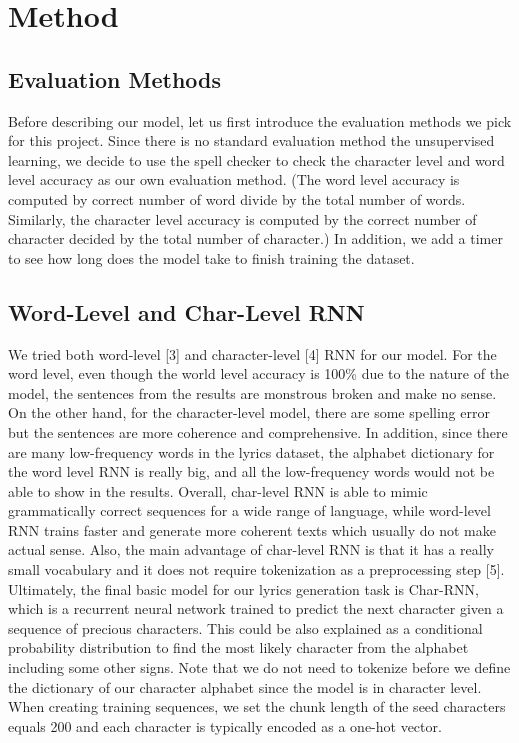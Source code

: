 \documentclass[11pt,a4paper]{article}
\begin{document}
\section{Method}
\subsection{Evaluation Methods}
Before describing our model, let us first introduce the evaluation methods we pick for this project. Since there is no standard evaluation method the unsupervised learning, we decide to use the spell checker to check the character level and word level accuracy as our own evaluation method. (The word level accuracy is computed by correct number of word divide by the total number of words. Similarly, the character level accuracy is computed by the correct number of character decided by the total number of character.) In addition, we add a timer to see how long does the model take to finish training the dataset. 

\subsection{Word-Level and Char-Level RNN}
We tried both word-level [3] and character-level [4] RNN for our model. For the word level, even though the world level accuracy is 100\% due to the nature of the model, the sentences from the results are monstrous broken and make no sense. On the other hand, for the character-level model, there are some spelling error but the sentences are more coherence and comprehensive. In addition, since there are many low-frequency words in the lyrics dataset, the alphabet dictionary for the word level RNN is really big, and all the low-frequency words would not be able to show in the results. Overall, char-level RNN is able to mimic grammatically correct sequences for a wide range of language, while word-level RNN trains faster and generate more coherent texts which usually do not make actual sense. Also, the main advantage of char-level RNN is that it has a really small vocabulary and it does not require tokenization as a preprocessing step [5]. Ultimately, the final basic model for our lyrics generation task is Char-RNN, which is a recurrent neural network trained to predict the next character given a sequence of precious characters. This could be also explained as a conditional probability distribution to find the most likely character from the alphabet including some other signs. Note that we do not need to tokenize before we define the dictionary of our character alphabet since the model is in character level. When creating training sequences, we set the chunk length of the seed characters equals 200 and each character is typically encoded as a one-hot vector. 
\end{document}
